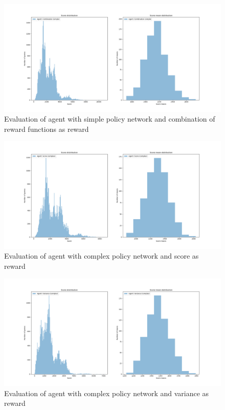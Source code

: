 \documentclass[11pt, fleqn]{article}
\begin{document}
\begin{figure}[H]
	\centering
	\includegraphics[width=\linewidth]{"eval_combination_simple"}
	\caption{Evaluation of agent with simple policy network and combination of reward functions as reward}
\end{figure}


\begin{figure}[H]
	\centering
	\includegraphics[width=\linewidth]{"eval_score_complex"}
	\caption{Evaluation of agent with complex policy network and score as reward}
\end{figure}
\begin{figure}[H]
	\centering
	\includegraphics[width=\linewidth]{"eval_variance_complex"}
	\caption{Evaluation of agent with complex policy network and variance as reward}
\end{figure}
\end{document}
